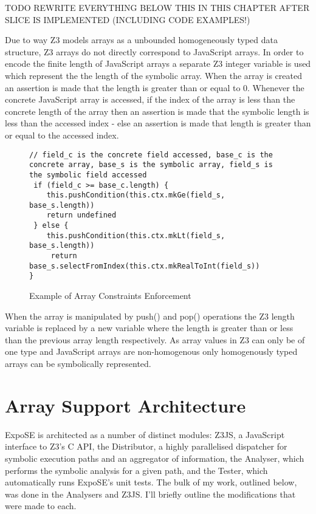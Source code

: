 \documentclass[]{final_report}
\begin{document}
TODO REWRITE EVERYTHING BELOW THIS IN THIS CHAPTER AFTER SLICE IS IMPLEMENTED (INCLUDING CODE EXAMPLES!)

Due to way Z3 models arrays as a unbounded homogeneously typed data structure, Z3 arrays do not directly correspond to JavaScript arrays. In order to encode the finite length of JavaScript arrays a separate Z3 integer variable is used which represent the the length of the symbolic array. When the array is created an assertion is made that the length is greater than or equal to 0. Whenever the concrete JavaScript array is accessed, if the index of the array is less than the concrete length of the array then an assertion is made that the symbolic length is less than the accessed index - else an assertion is made that length is greater than or equal to the accessed index.

\begin{figure}[h]
\begin{verbatim}
// field_c is the concrete field accessed, base_c is the concrete array, base_s is the symbolic array, field_s is the symbolic field accessed
 if (field_c >= base_c.length) {
    this.pushCondition(this.ctx.mkGe(field_s, base_s.length))
    return undefined
 } else {
    this.pushCondition(this.ctx.mkLt(field_s, base_s.length))
     return base_s.selectFromIndex(this.ctx.mkRealToInt(field_s))
}
\end{verbatim}
\caption{\label{fig:expose-get-field} Example of Array Constraints Enforcement}
\end{figure}

When the array is manipulated by push() and pop() operations the Z3 length variable is replaced by a new variable where the length is greater than or less than the previous array length respectively. As array values in Z3 can only be of one type and JavaScript arrays are non-homogenous only homogenously typed arrays can be symbolically represented.

\section{Array Support Architecture}
ExpoSE is architected as a number of distinct modules: Z3JS, a JavaScript interface to Z3’s C API, the Distributor, a highly parallelised dispatcher for symbolic execution paths and an aggregator of information, the Analyser, which performs the symbolic analysis for a given path, and the Tester, which automatically runs ExpoSE’s unit tests. The bulk of my work, outlined below, was done in the Analysers and Z3JS. I’ll briefly outline the modifications that were made to each.
\end{document}
